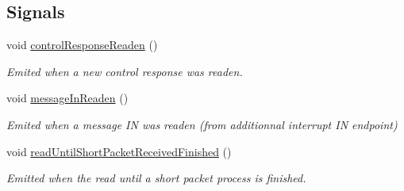 \subsection*{Signals}
\begin{DoxyCompactItemize}
\item 
void \hyperlink{classmdt_usb_port_thread_ab8ac3a6e1b571215be86f9dfd8c48b2b}{control\-Response\-Readen} ()
\begin{DoxyCompactList}\small\item\em Emited when a new control response was readen. \end{DoxyCompactList}\item 
void \hyperlink{classmdt_usb_port_thread_a850204a909f0bbe41c5e995ebe3670d8}{message\-In\-Readen} ()
\begin{DoxyCompactList}\small\item\em Emited when a message I\-N was readen (from additionnal interrupt I\-N endpoint) \end{DoxyCompactList}\item 
void \hyperlink{classmdt_usb_port_thread_a54e65bed60200cd2150b5a7b063c723e}{read\-Until\-Short\-Packet\-Received\-Finished} ()
\begin{DoxyCompactList}\small\item\em Emitted when the read until a short packet process is finished. \end{DoxyCompactList}\end{DoxyCompactItemize}
